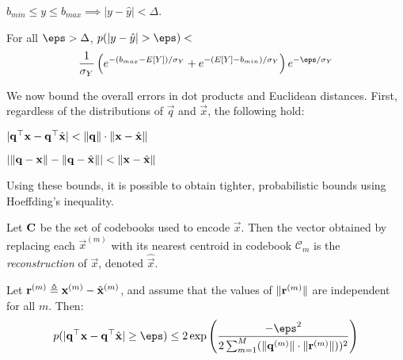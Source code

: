\begin{lemma}
$b_{min} \le y \le b_{max} \implies |y - \hat{y}| < \Delta$.
\end{lemma}

\begin{lemma}
For all $\eps > \Delta$, \hspace{1mm} $p(|y - \hat{y}| > \eps) <$
\begin{align}
        \frac{1}{\sigma_Y} \left(
            e^{-(b_{max}- E[Y]) / \sigma_Y}
            + e^{-(E[Y] - b_{min}) / \sigma_Y}
        \right)e^{-\eps / \sigma_Y}
\end{align}
\end{lemma}

We now bound the overall errors in dot products and Euclidean distances. First, regardless of the distributions of $\vec{q}$ and $\vec{x}$, the following hold:

\begin{lemma}
$\lvert\mathbf{q}^\top \mathbf{x} - \mathbf{q}^\top \hat{\mathbf{x}}\rvert < \lVert\mathbf{q}\rVert \cdot \lVert\mathbf{x} - \hat{\mathbf{x}}\rVert$
\end{lemma}

\begin{lemma}
$\lvert\lVert\mathbf{q} - \mathbf{x}\rVert - \lVert\mathbf{q} - \hat{\mathbf{x}}\rVert \rvert < \lVert\mathbf{x} - \hat{\mathbf{x}}\rVert$
\end{lemma}

\noindent Using these bounds, it is possible to obtain tighter, probabilistic bounds using Hoeffding's inequality.

\begin{definition}[Reconstruction]
Let $\mathbf{C}$ be the set of codebooks used to encode $\vec{x}$. Then the vector obtained by replacing each $\vec{x}^{(m)}$ with its nearest centroid in codebook $\mathcal{C}_m$ is the \textit{reconstruction} of $\vec{x}$, denoted $\hat{\vec{x}}$.
\end{definition}

\begin{lemma}
Let $\mathbf{r}^{(m)} \triangleq \mathbf{x}^{(m)} - \hat{\mathbf{x}}^{(m)}$, and assume that the values of $\lVert \mathbf{r}^{(m)} \rVert$ are independent for all $m$. Then: %
\begin{align} \label{eq:dot_indep}
    p(\abs{\q^\top \x - \q^\top \xhat} \ge \eps) \le 2\exp \left( \frac{-\eps^2}{
        2 \sum_{m=1}^M (\norm{\q^{(m)}} \cdot \norm{ \r^{(m)} }))^2
    }\right)
\end{align}
\end{lemma}

